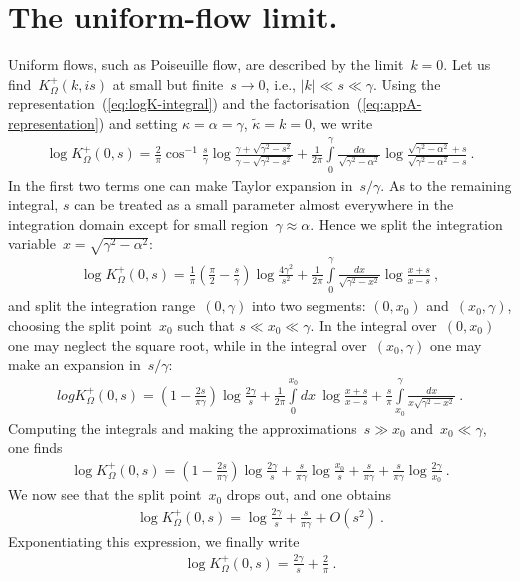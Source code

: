 \documentclass[preprint,aps,eqsecnum, prb]{revtex4-1}
\newcommand{\fplus}[1]{{#1}^{+}}
\begin{document}
\section{The uniform-flow limit.}
\label{sec:k=0-limit}

Uniform flows, such as Poiseuille flow, are described by the limit~$k = 0$.
Let us find~$\fplus{K}_\Omega(k, is)$ at small but finite~$s \to 0$,
i.e., $|k| \ll s \ll \gamma$. Using the representation~(\ref{eq:logK-integral}) and the factorisation~(\ref{eq:appA-representation}) and setting
$\kappa = \alpha = \gamma$, $\tilde{\kappa} = k = 0$, we write
\begin{align}
\log \fplus{K}_\Omega(0, s) = \frac{2}{\pi} \cos^{-1}\frac{s}{\gamma}
\log\frac{\gamma + \sqrt{\gamma^2 - s^2}}{\gamma - \sqrt{\gamma^2 - s^2}}
+ \frac{1}{2\pi} \int\limits_{0}^{\gamma}
      \frac{d\alpha}{\sqrt{\gamma^2 - \alpha^2}}
       \log\frac{\sqrt{\gamma^2 - \alpha^2} + s}{
                     \sqrt{\gamma^2 - \alpha^2 } - s}\ .
\end{align}
In the first two terms one can make Taylor expansion in~$s/\gamma$. As to the
remaining integral,  $s$ can be treated as a small parameter almost
everywhere in the integration domain except for
 small region~$\gamma \approx\alpha$. Hence we split the integration
 variable~$x = \sqrt{\gamma^2 - \alpha^2}$:
 \begin{align}
 \log \fplus{K}_\Omega(0, s) = \frac{1}{\pi} \left(\frac{\pi}{2} - \frac{s}{\gamma}\right) \log\frac{4 \gamma^2}{s^2}
 + \frac{1}{2\pi} \int\limits_{0}^{\gamma}
 \frac{dx}{\sqrt{\gamma^2 - x^2}} \log\frac{x + s}{x - s}\ ,
 \end{align}
 and split the integration range~$(0, \gamma)$ into two segments: $(0, x_0)$
 and~$(x_0, \gamma)$, choosing the split point~$x_0$ such that
 $s \ll x_0 \ll \gamma$. In the integral over~$(0, x_0)$ one may
 neglect the square root, while in the integral over~$(x_0, \gamma)$
 one may make an expansion in~$s/\gamma$:
 \begin{align}
 log \fplus{K}_\Omega(0, s) = \left(1 - \frac{2s}{\pi\gamma}\right)
 \log\frac{2\gamma}{s}  + \frac{1}{2\pi} \int\limits_{0}^{x_0}
 dx \, \log\frac{x + s}{x - s} + \frac{s}{\pi} \int\limits_{x_0}^{\gamma}
 \frac{dx}{x\sqrt{\gamma^2 - x^2}}\ .
\end{align}
Computing the integrals and making the approximations~$s \gg x_0$
and~$x_0 \ll \gamma$, one finds
\begin{align}
\log \fplus{K}_\Omega(0, s) = \left(1 - \frac{2s}{\pi\gamma}\right)
\log\frac{2\gamma}{s}  +  \frac{s}{\pi\gamma} \log \frac{x_0}{s}
+ \frac{s}{\pi\gamma} + \frac{s}{\pi\gamma} \log\frac{2\gamma}{x_0}\ .
\end{align}
We now see that the split point~$x_0$ drops out, and one obtains
\begin{align}
\log \fplus{K}_\Omega(0, s) = \log\frac{2\gamma}{s} + \frac{s}{\pi\gamma}
+ O(s^2)\ .
\end{align}
Exponentiating this expression, we finally write
\begin{align}
\log\fplus{K}_\Omega(0, s) = \frac{2\gamma}{s} + \frac{2}{\pi}\ .
\end{align}
\end{document}
